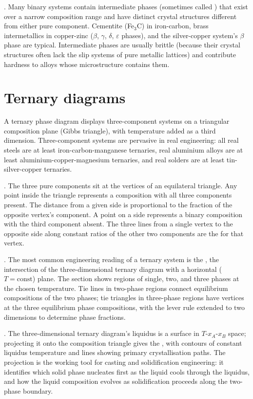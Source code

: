 . Many binary systems contain
intermediate phases (sometimes called ) that exist over a narrow composition range and have
distinct crystal structures different from either pure component.
Cementite (Fe$_3$C) in iron-carbon, brass intermetallics in
copper-zinc ($\beta$, $\gamma$, $\delta$, $\varepsilon$ phases), and
the silver-copper system's $\beta$ phase are typical. Intermediate
phases are usually brittle (because their crystal structures often
lack the slip systems of pure metallic lattices) and contribute
hardness to alloys whose microstructure contains them.

\section{Ternary diagrams}

A ternary phase diagram displays three-component systems on a triangular
composition plane (Gibbs triangle), with temperature added as a third
dimension. Three-component systems are pervasive in real engineering:
all real steels are at least iron-carbon-manganese ternaries, real
aluminium alloys are at least aluminium-copper-magnesium ternaries,
and real solders are at least tin-silver-copper ternaries.

. The three pure components sit at
the vertices of an equilateral triangle. Any point inside the triangle
represents a composition with all three components present. The
distance from a given side is proportional to the fraction of the
opposite vertex's component. A point on a side represents a binary
composition with the third component absent. The three lines from a
single vertex to the opposite side along constant ratios of the other
two components are the  for that vertex.

. The most common engineering reading of
a ternary system is the , the
intersection of the three-dimensional ternary diagram with a horizontal
($T = \text{const}$) plane. The section shows regions of single, two,
and three phases at the chosen temperature. Tie lines in two-phase
regions connect equilibrium compositions of the two phases; tie
triangles in three-phase regions have vertices at the three
equilibrium phase compositions, with the lever rule extended to two
dimensions to determine phase fractions.

. The three-dimensional ternary diagram's
liquidus is a surface in $T$-$x_A$-$x_B$ space; projecting it onto the
composition triangle gives the , with
contours of constant liquidus temperature and lines showing primary
crystallisation paths. The projection is the working tool for casting
and solidification engineering: it identifies which solid phase
nucleates first as the liquid cools through the liquidus, and how the
liquid composition evolves as solidification proceeds along the
two-phase boundary.

